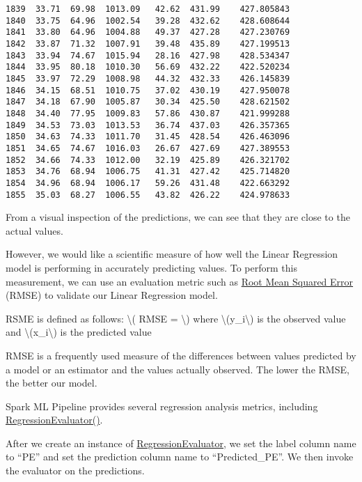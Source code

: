 \documentclass[11pt]{article}
\begin{document}
\begin{tcolorbox}[breakable, size=fbox, boxrule=.5pt, pad at break*=1mm, opacityfill=0]
\begin{Verbatim}[commandchars=\\\{\}]
1839  33.71  69.98  1013.09   42.62  431.99    427.805843
1840  33.75  64.96  1002.54   39.28  432.62    428.608644
1841  33.80  64.96  1004.88   49.37  427.28    427.230769
1842  33.87  71.32  1007.91   39.48  435.89    427.199513
1843  33.94  74.67  1015.94   28.16  427.98    428.534347
1844  33.95  80.18  1010.30   56.69  432.22    422.520234
1845  33.97  72.29  1008.98   44.32  432.33    426.145839
1846  34.15  68.51  1010.75   37.02  430.19    427.950078
1847  34.18  67.90  1005.87   30.34  425.50    428.621502
1848  34.40  77.95  1009.83   57.86  430.87    421.999288
1849  34.53  73.03  1013.53   36.74  437.03    426.357365
1850  34.63  74.33  1011.70   31.45  428.54    426.463096
1851  34.65  74.67  1016.03   26.67  427.69    427.389553
1852  34.66  74.33  1012.00   32.19  425.89    426.321702
1853  34.76  68.94  1006.75   41.31  427.42    425.714820
1854  34.96  68.94  1006.17   59.26  431.48    422.663292
1855  35.03  68.27  1006.55   43.82  426.22    424.978633
\end{Verbatim}
\end{tcolorbox}
        
    From a visual inspection of the predictions, we can see that they are
close to the actual values.

However, we would like a scientific measure of how well the Linear
Regression model is performing in accurately predicting values. To
perform this measurement, we can use an evaluation metric such as
\href{https://en.wikipedia.org/wiki/Root-mean-square_deviation}{Root
Mean Squared Error} (RMSE) to validate our Linear Regression model.

RSME is defined as follows: \textbackslash( RMSE =
\textbackslash) where
\textbackslash(y\_i\textbackslash) is the observed value and
\textbackslash(x\_i\textbackslash) is the predicted value

RMSE is a frequently used measure of the differences between values
predicted by a model or an estimator and the values actually observed.
The lower the RMSE, the better our model.

Spark ML Pipeline provides several regression analysis metrics,
including
\href{https://spark.apache.org/docs/latest/api/python/reference/api/pyspark.ml.evaluation.RegressionEvaluator.html?highlight=regressionevaluator\#pyspark.ml.evaluation.RegressionEvaluator}{RegressionEvaluator()}.

After we create an instance of
\href{https://spark.apache.org/docs/latest/api/python/reference/api/pyspark.ml.evaluation.RegressionEvaluator.html?highlight=regressionevaluator\#pyspark.ml.evaluation.RegressionEvaluator}{RegressionEvaluator},
we set the label column name to ``PE'' and set the prediction column
name to ``Predicted\_PE''. We then invoke the evaluator on the
predictions.
\end{document}
